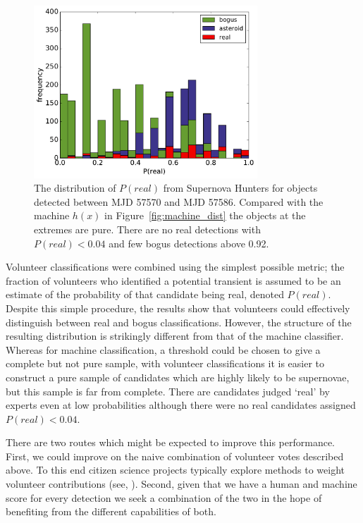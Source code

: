 \documentclass[a4paper,fleqn,usenatbib]{mnras}
\begin{document}
\begin{figure}
   \includegraphics[width=84mm]{figs/human_hist.pdf}
   \caption{The distribution of $P(real)$ from Supernova Hunters for objects detected between 
            MJD 57570 and MJD 57586.  Compared with the machine $h(x)$ in Figure~\ref{fig:machine_dist}
            the objects at the extremes are pure.  There are no real detections with 
            $P(real) < 0.04$ and few bogus detections above 0.92.} 
   \label{fig:human_dist} 
\end{figure}

Volunteer classifications were combined using the simplest possible metric; the fraction of volunteers who identified a potential transient is assumed to be an estimate of the probability of that candidate being real, denoted $P(real)$. Despite this simple procedure, the results show that volunteers could effectively distinguish between real and bogus classifications. However, the structure of the resulting distribution is strikingly different from that of the machine classifier. Whereas for machine classification, a threshold could be chosen to give a complete but not pure sample, with volunteer classifications it is easier to construct a pure sample of candidates which are highly likely to be supernovae, but this sample is far from complete. There are candidates judged `real' by experts even at low probabilities although there were no real candidates assigned $P(real) < 0.04$. 

There are two routes which might be expected to improve this performance.  First, we could improve on the naive combination of volunteer votes described above.  To this end citizen science projects typically explore methods to weight volunteer contributions (see, \citet{Schwamb12, Marshall16}).  Second, given that we have a human and machine score for every detection we seek a combination of the two in the hope of benefiting from the different capabilities of both.
\end{document}
